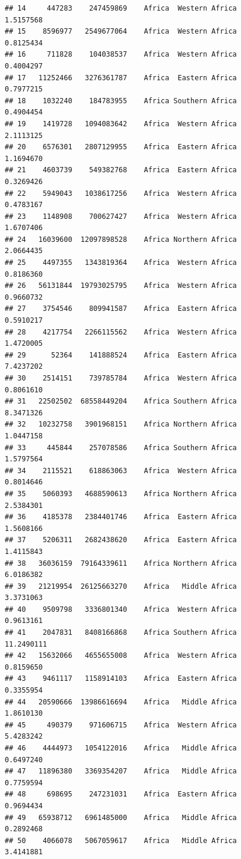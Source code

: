 \documentclass[
]{article}
\begin{document}
\begin{verbatim}
## 14     447283    247459869    Africa  Western Africa       1.5157568
## 15    8596977   2549677064    Africa  Western Africa       0.8125434
## 16     711828    104038537    Africa  Western Africa       0.4004297
## 17   11252466   3276361787    Africa  Eastern Africa       0.7977215
## 18    1032240    184783955    Africa Southern Africa       0.4904454
## 19    1419728   1094083642    Africa  Western Africa       2.1113125
## 20    6576301   2807129955    Africa  Eastern Africa       1.1694670
## 21    4603739    549382768    Africa  Eastern Africa       0.3269426
## 22    5949043   1038617256    Africa  Western Africa       0.4783167
## 23    1148908    700627427    Africa  Western Africa       1.6707406
## 24   16039600  12097898528    Africa Northern Africa       2.0664435
## 25    4497355   1343819364    Africa  Western Africa       0.8186360
## 26   56131844  19793025795    Africa  Western Africa       0.9660732
## 27    3754546    809941587    Africa  Eastern Africa       0.5910217
## 28    4217754   2266115562    Africa  Western Africa       1.4720005
## 29      52364    141888524    Africa  Eastern Africa       7.4237202
## 30    2514151    739785784    Africa  Western Africa       0.8061610
## 31   22502502  68558449204    Africa Southern Africa       8.3471326
## 32   10232758   3901968151    Africa Northern Africa       1.0447158
## 33     445844    257078586    Africa Southern Africa       1.5797564
## 34    2115521    618863063    Africa  Western Africa       0.8014646
## 35    5060393   4688590613    Africa Northern Africa       2.5384301
## 36    4185378   2384401746    Africa  Eastern Africa       1.5608166
## 37    5206311   2682438620    Africa  Eastern Africa       1.4115843
## 38   36036159  79164339611    Africa Northern Africa       6.0186382
## 39   21219954  26125663270    Africa   Middle Africa       3.3731063
## 40    9509798   3336801340    Africa  Western Africa       0.9613161
## 41    2047831   8408166868    Africa Southern Africa      11.2490111
## 42   15632066   4655655008    Africa  Western Africa       0.8159650
## 43    9461117   1158914103    Africa  Eastern Africa       0.3355954
## 44   20590666  13986616694    Africa   Middle Africa       1.8610130
## 45     490379    971606715    Africa  Western Africa       5.4283242
## 46    4444973   1054122016    Africa   Middle Africa       0.6497240
## 47   11896380   3369354207    Africa   Middle Africa       0.7759594
## 48     698695    247231031    Africa  Eastern Africa       0.9694434
## 49   65938712   6961485000    Africa   Middle Africa       0.2892468
## 50    4066078   5067059617    Africa   Middle Africa       3.4141881

\end{verbatim}
\end{document}
